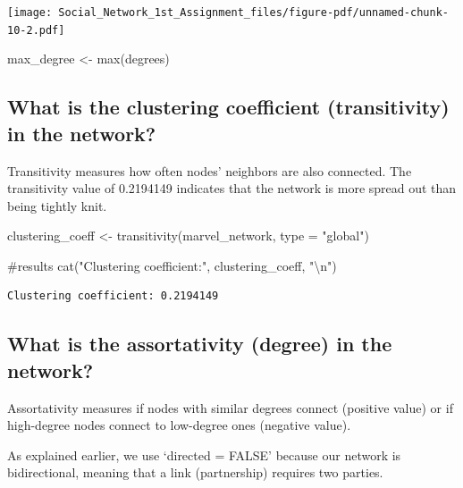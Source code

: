 \documentclass[
  letterpaper,
  DIV=11,
  numbers=noendperiod]{scrartcl}
\newenvironment{Shaded}{\begin{snugshade}}{\end{snugshade}}
\newcommand{\AttributeTok}[1]{\textcolor[rgb]{0.40,0.45,0.13}{#1}}
\newcommand{\CommentTok}[1]{\textcolor[rgb]{0.37,0.37,0.37}{#1}}
\newcommand{\FunctionTok}[1]{\textcolor[rgb]{0.28,0.35,0.67}{#1}}
\newcommand{\NormalTok}[1]{\textcolor[rgb]{0.00,0.23,0.31}{#1}}
\newcommand{\OtherTok}[1]{\textcolor[rgb]{0.00,0.23,0.31}{#1}}
\newcommand{\SpecialCharTok}[1]{\textcolor[rgb]{0.37,0.37,0.37}{#1}}
\newcommand{\StringTok}[1]{\textcolor[rgb]{0.13,0.47,0.30}{#1}}
\begin{document}
\texttt{[image: Social\_Network\_1st\_Assignment\_files/figure-pdf/unnamed-chunk-10-2.pdf]}

\begin{Shaded}
\begin{Highlighting}[]
\NormalTok{max\_degree }\OtherTok{\textless{}{-}} \FunctionTok{max}\NormalTok{(degrees)}
\end{Highlighting}
\end{Shaded}

\subsection{What is the clustering coefficient (transitivity) in the
network?}\label{what-is-the-clustering-coefficient-transitivity-in-the-network}

Transitivity measures how often nodes' neighbors are also connected. The
transitivity value of 0.2194149 indicates that the network is more
spread out than being tightly knit.

\begin{Shaded}
\begin{Highlighting}[]
\NormalTok{clustering\_coeff }\OtherTok{\textless{}{-}} \FunctionTok{transitivity}\NormalTok{(marvel\_network, }\AttributeTok{type =} \StringTok{"global"}\NormalTok{)}

\CommentTok{\#results}
\FunctionTok{cat}\NormalTok{(}\StringTok{"Clustering coefficient:"}\NormalTok{, clustering\_coeff, }\StringTok{"}\SpecialCharTok{\textbackslash{}n}\StringTok{"}\NormalTok{)}
\end{Highlighting}
\end{Shaded}

\begin{verbatim}
Clustering coefficient: 0.2194149 
\end{verbatim}

\subsection{What is the assortativity (degree) in the
network?}\label{what-is-the-assortativity-degree-in-the-network}

Assortativity measures if nodes with similar degrees connect (positive
value) or if high-degree nodes connect to low-degree ones (negative
value).

As explained earlier, we use `directed = FALSE' because our network is
bidirectional, meaning that a link (partnership) requires two parties.
\end{document}
